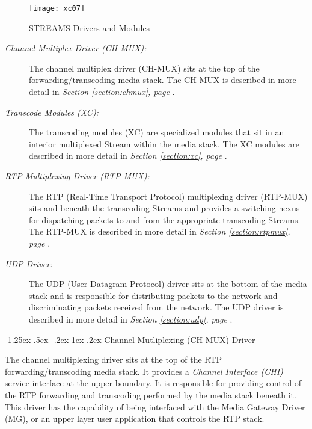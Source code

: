 \documentclass[letterpaper,final,notitlepage,twocolumn,10pt,twoside]{article}
\makeatletter
\let\normalsize = \small
\let\small = \footnotesize
\let\footnotesize = \scriptsize
\let\scriptsize = \tiny
\renewcommand\subsubsection{\@startsection{subsubsection}{3}{\z@}%
                                     {-1.25ex\@plus -.5ex \@minus -.2ex}%
                                     {1ex \@plus .2ex}%
                                     {\normalfont\normalsize\bfseries}}
\makeatother
\begin{document}
\begin{figure}[htp]
\center\texttt{[image: xc07]}
\caption{STREAMS Drivers and Modules}
\label{figure:xc07}
\end{figure}

\begin{description}

\item[{\it Channel Multiplex Driver (CH-MUX):}] The channel multiplex driver
(CH-MUX) sits at the top of the forwarding/transcoding media stack.  The CH-MUX
is described in more detail in \textsl{Section \ref{section:chmux}, page
\pageref{section:chmux}}.

\item[{\it Transcode Modules (XC):}] The transcoding modules (XC) are specialized
modules that sit in an interior multiplexed Stream within the media stack.  The
XC modules are described in more detail in \textsl{Section \ref{section:xc},
page \pageref{section:xc}}.

\item[{\it RTP Multiplexing Driver (RTP-MUX):}] The RTP (Real-Time Transport
Protocol) multiplexing driver (RTP-MUX) sits and beneath the transcoding Streams
and provides a switching nexus for dispatching packets to and from the
appropriate transcoding Streams.  The RTP-MUX is described in more detail in
\textsl{Section \ref{section:rtpmux}, page \pageref{section:rtpmux}}.

\item[{\it UDP Driver:}] The UDP (User Datagram Protocol) driver sits at the
bottom of the media stack and is responsible for distributing packets to the
network and discriminating packets received from the network.  The UDP driver is
described in more detail in \textsl{Section \ref{section:udp}, page
\pageref{section:udp}}.

\end{description}

\subsubsection{Channel Mutliplexing (CH-MUX) Driver}
\label{section:chmux}

The channel multiplexing driver sits at the top of the RTP
forwarding/transcoding media stack.  It provides a \textsl{Channel Interface
(CHI)} \cite[]{CHI} service interface at the upper boundary.  It is responsible
for providing control of the RTP forwarding and transcoding performed by the
media stack beneath it.  This driver has the capability of being interfaced with
the Media Gateway Driver (MG), or an upper layer user application that controls
the RTP stack.
\end{document}
